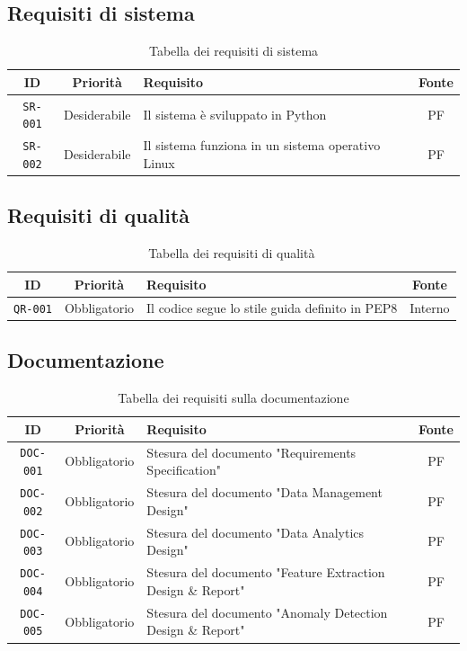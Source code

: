 \subsection{Requisiti di sistema}
\begin{table} [H]
	\centering
	\begin{tabularx}{\textwidth}{|c c X c|} 
		\hline
		ID & Priorità & Requisito & Fonte \\ [0.5ex] 
		\hline\hline
		\texttt{SR-001} & Desiderabile & Il sistema è sviluppato in Python & PF \\ 
		\hline
		\texttt{SR-002} & Desiderabile & Il sistema funziona in un sistema operativo Linux & PF \\ 
		\hline
		
	\end{tabularx}
	\caption{Tabella dei requisiti di sistema}
\end{table}

\subsection{Requisiti di qualità}
\begin{table} [H]
	\centering
	\begin{tabularx}{\textwidth}{|c c X c|} 
		\hline
		ID & Priorità & Requisito & Fonte \\ [0.5ex] 
		\hline\hline
		\texttt{QR-001} & Obbligatorio & Il codice segue lo stile guida definito in PEP8 & Interno \\ 
		\hline
		
	\end{tabularx}
	\caption{Tabella dei requisiti di qualità}
\end{table}

\subsection{Documentazione}
\begin{table} [H]
	\centering
	\begin{tabularx}{\textwidth}{|c c X c|} 
		\hline
		ID & Priorità & Requisito & Fonte \\ [0.5ex] 
		\hline\hline
		\texttt{DOC-001} & Obbligatorio & Stesura del documento "Requirements Specification" & PF \\ 
		\hline
		\texttt{DOC-002} & Obbligatorio & Stesura del documento "Data Management Design" & PF \\ 
		\hline
		\texttt{DOC-003} & Obbligatorio & Stesura del documento "Data Analytics Design" & PF \\ 
		\hline
		\texttt{DOC-004} & Obbligatorio & Stesura del documento "Feature Extraction Design \& Report" & PF \\ 
		\hline
		\texttt{DOC-005} & Obbligatorio & Stesura del documento "Anomaly Detection Design \& Report" & PF \\ 
		\hline
	\end{tabularx}
	\caption{Tabella dei requisiti sulla documentazione}
\end{table}

